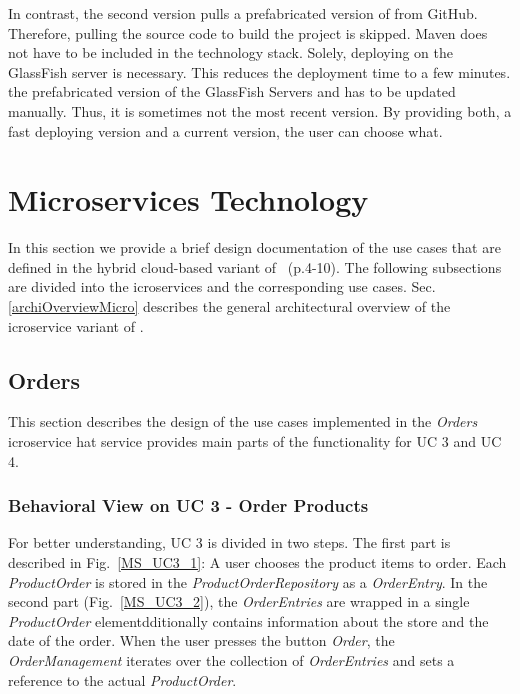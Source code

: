 In contrast, the second version pulls a prefabricated version of \CoCoME from GitHub. 
Therefore, pulling the source code to build the \CoCoME project is skipped. 
Maven does not have to be included in the technology stack. 
Solely, deploying \CoCoME on the GlassFish server is necessary.
This reduces the deployment time to a few minutes.
 the prefabricated version of the GlassFish Servers and \CoCoME has to be updated manually. 
Thus, it is sometimes not the most recent version.
By providing both, a fast deploying version and a current version, the user can choose what.
	

	

	
\section{Microservices Technology} \label{MS}
In this section we provide a brief design documentation of the use cases that are defined in the hybrid cloud-based variant of \CoCoME~\cite{herold2008}(p.4-10).
The following subsections are divided into the icroservices and the corresponding use cases. 
Sec.\ref{archiOverviewMicro} describes the general architectural overview of the icroservice variant of \CoCoME.
	

	

	\FloatBarrier
		\subsection{Orders}
		This section describes the design of the use cases implemented in the \textit{Orders} icroservice
		hat service provides main parts of the functionality for UC 3 and UC 4.

		\subsubsection*{Behavioral View on UC 3 - Order Products} 
		For  better understanding, UC 3 is divided in two steps. The first part is described in Fig.~\ref{MS_UC3_1}: A user chooses the product items to order. Each \textit{ProductOrder} is stored in the \textit{ProductOrderRepository} as a \textit{OrderEntry}. In the second part (Fig.~\ref{MS_UC3_2}), the \textit{OrderEntries} are wrapped in a single \textit{ProductOrder} elementdditionally contains information about the store and the date of the order. When the user presses the button \textit{Order}, the \textit{OrderManagement} iterates over the collection of \textit{OrderEntries} and sets a reference to the actual \textit{ProductOrder}.
	

